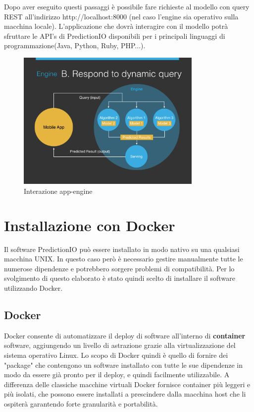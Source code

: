 Dopo aver eseguito questi passaggi è possibile fare richieste al modello con query REST all'indirizzo http://localhost:8000 (nel caso l'engine sia operativo sulla macchina locale). L'applicazione che dovrà interagire con il modello potrà sfruttare le API's di PredictionIO disponibili per i principali linguaggi di programmazione(Java, Python, Ruby, PHP...).

\begin{figure}[!h]
\includegraphics[width=0.8\textwidth]{immagini/deploy.png}
\caption{Interazione app-engine \cite{sitopredictionio}}
\label{fig:deploy}
\end{figure}

\newpage

\section{Installazione con Docker}
Il software PredictionIO può essere installato in modo nativo su una qualsiasi macchina UNIX. In questo caso però è necessario gestire manualmente tutte le numerose dipendenze e potrebbero sorgere problemi di compatibilità. Per lo svolgimento di questo elaborato è stato quindi scelto di installare il software utilizzando Docker.

\subsection{Docker}
Docker consente di automatizzare il deploy di software all'interno di \textbf{container} software, aggiungendo un livello di astrazione grazie alla virtualizzazione del sistema operativo Linux. Lo scopo di Docker quindi è quello di fornire dei "package" che contengono un software installato con tutte le sue dipendenze in modo da essere già pronto per il deploy, e quindi facilmente utilizzabile. A differenza delle classiche macchine virtuali Docker fornisce container più leggeri e più isolati, che possono essere installati a prescindere dalla macchina host che li ospiterà garantendo forte granularità e portabilità.

